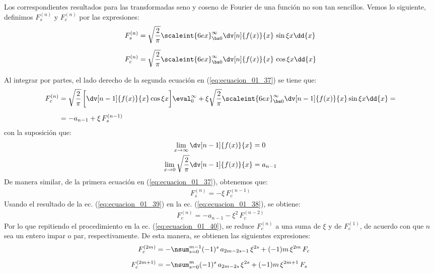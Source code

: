 \par
Los correspondientes resultados para las transformadas seno y coseno de Fourier de una función no son tan sencillos. Vemos lo siguiente, definimos $F_{s}^{(n)}$ y $F_{c}^{(n)}$ por las expresiones:
\begin{align}
\begin{aligned}
F_{s}^{(n)} &= \sqrt{\dfrac{2}{\pi}} \scaleint{6ex}_{\bs 0}^{\infty} \dv[n]{f(x)}{x} \, \sin \xi x \dd{x} \\[0.5em]
F_{c}^{(n)} &= \sqrt{\dfrac{2}{\pi}} \scaleint{6ex}_{\bs 0}^{\infty} \dv[n]{f(x)}{x} \, \cos \xi x \dd{x} \\[0.5em]
\end{aligned}
\label{eq:ecuacion_01_37}
\end{align}
Al integrar por partes, el lado derecho de la segunda ecuación en (\ref{eq:ecuacion_01_37}) se tiene que:
\begin{align}
\begin{aligned}[b]
F_{c}^{(n)} &= \sqrt{\dfrac{2}{\pi}} \, \bigg[ \dv[n-1]{f(x)}{x} \cos \xi x \bigg] \eval_{0}^{\infty} + \xi \sqrt{\dfrac{2}{\pi}} \scaleint{6ex}_{\bs 0}^{\infty} \dv[n-1]{f(x)}{x} \sin \xi x \dd{x} = \\[0.5em]
&= -a_{n-1} + \xi \, F_{s}^{(n-1)}
\end{aligned}
\label{eq:ecuacion_01_38}
\end{align}
con la suposición que:
\begin{align*}
\lim_{x \to \infty} \dv[n-1]{f(x)}{x} &= 0 \\
\lim_{x \to 0}  \sqrt{\dfrac{2}{\pi}} \dv[n-1]{f(x)}{x} &= a_{n-1}
\end{align*}
De manera similar, de la primera ecuación en (\ref{eq:ecuacion_01_37}), obtenemos que:
\begin{align}
F_{s}^{(n)} = - \xi \, F_{c}^{(n-1)}
\label{eq:ecuacion_01_39}
\end{align}
Usando el resultado de la ec. (\ref{eq:ecuacion_01_39}) en la ec. (\ref{eq:ecuacion_01_38}), se obtiene:
\begin{align}
F_{c}^{(n)} = - a_{n-1} - \xi^{2} \, F_{c}^{(n-2)}
\label{eq:ecuacion_01_40}
\end{align}
Por lo que repitiendo el procedimiento en la ec. (\ref{eq:ecuacion_01_40}), se reduce $F_{c}^{(n)}$ a una suma de $\xi$ y de $F_{c}^{(1)}$, de acuerdo con que $n$ sea un entero impar o par, respectivamente. De esta manera, se obtienen las siguientes expresiones:
\begin{align}
F_{c}^{(2m)} &= - \nsum_{s=0}^{m-1} (-1)^{s} \, a_{2m-2s-1} \, \xi^{2s} + (-1){m} \, \xi^{2m} \, F_{c} \label{eq:ecuacion_01_41} \\[0.5em]
F_{c}^{(2m+1)} &= - \nsum_{s=0}^{m} (-1)^{s} \, a_{2m-2s} \, \xi^{2s} + (-1){m} \, \xi^{2m+1} \, F_{s} \label{eq:ecuacion_01_42}
\end{align}

